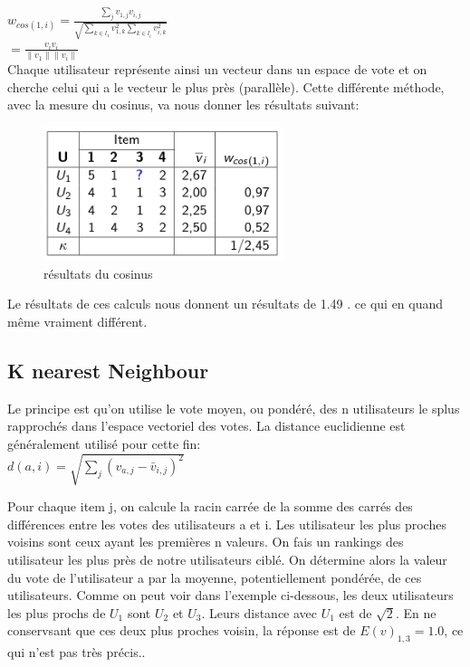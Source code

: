 \documentclass[oneside]{book}
\begin{document}
\centering
$w_{cos(1,i)} =
\frac
{\sum\limits_j v_{1,j} v_{i,j}}
{\sqrt{\sum\limits_{k\in l_1} v_{1,k}^2 \sum\limits_{k\in l_i} v_{i,k}^2}}$\\


$ = \frac{v_i v_i}{\parallel v_1 \parallel \parallel v_i \parallel}$\\

\justify
Chaque utilisateur représente ainsi un vecteur dans un espace de vote et on cherche celui qui a le vecteur le plus près (parallèle). Cette différente méthode, avec la mesure du cosinus, va nous donner les résultats suivant:\\

\begin{figure}[!ht]
\centering
\includegraphics[width=7cm]{resultats_cosinus.png}
\caption{résultats du cosinus}
\label{fig:resultats_cosinus}
\end{figure}

Le résultats de ces calculs nous donnent un résultats de 1.49 . ce qui en quand même vraiment différent. \\


\subsection{K nearest Neighbour}
Le principe est qu'on utilise le vote moyen, ou pondéré, des n utilisateurs le splus rapprochés dans l'espace vectoriel des votes. La distance euclidienne est généralement utilisé pour cette fin:\\

\centering
$d(a,i) = \sqrt{\sum\limits_j (v_{a,j} - \bar{v}_{i,j})^2}$
\justify

Pour chaque item j, on calcule la racin carrée de la somme des carrés des différences entre les votes des utilisateurs a et i. Les utilisateur les plus proches voisins sont ceux ayant les premières n valeurs. On fais un rankings des utilisateur les plus près de notre utilisateurs ciblé. On détermine alors la valeur du vote de l'utilisateur a par la moyenne, potentiellement pondérée, de ces utilisateurs. Comme on peut voir dans l'exemple ci-dessous, les deux utilisateurs les plus prochs de $U_1$ sont $U_2$ et $U_3$. Leurs distance avec $U_1$ est de $\sqrt{2}$. En ne conservsant que ces deux plus proches voisin, la réponse est de $E(v)_{1,3} = 1.0$, ce qui n'est pas très précis..
\end{document}
